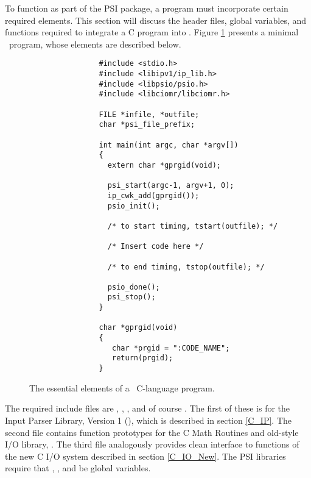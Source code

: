 %
%
%
%

To function as part of the PSI package, a program must incorporate
certain required elements.  This section will discuss the header
files, global variables, and functions required to integrate a C
program into \PSIthree.  Figure \ref{fig:Essential_C_Program} presents
a minimal \PSIthree\ program, whose elements are described below.

\begin{figure}
\begin{verbatim}
                #include <stdio.h>
                #include <libipv1/ip_lib.h>
                #include <libpsio/psio.h>
                #include <libciomr/libciomr.h>

                FILE *infile, *outfile;
                char *psi_file_prefix;

                int main(int argc, char *argv[])
                {
                  extern char *gprgid(void);

                  psi_start(argc-1, argv+1, 0);
                  ip_cwk_add(gprgid());
                  psio_init();

                  /* to start timing, tstart(outfile); */
                
                  /* Insert code here */

                  /* to end timing, tstop(outfile); */

                  psio_done();
                  psi_stop();
                }

                char *gprgid(void)
                {
                   char *prgid = ":CODE_NAME";
                   return(prgid);
                }               
\end{verbatim}
\caption{The essential elements of a \PSIthree\ C-language program.}
\label{fig:Essential_C_Program}
\end{figure}

The required include files are ,
, , and of course
.  The first of these is for the Input Parser Library,
Version 1 (), which is described in section
\ref{C_IP}.  The second file contains function prototypes for the C
Math Routines and old-style I/O library, .  The third
file analogously provides clean interface to functions of the new C
I/O system described in section \ref{C_IO_New}.  The PSI libraries
require that , , and
 be global variables.  


